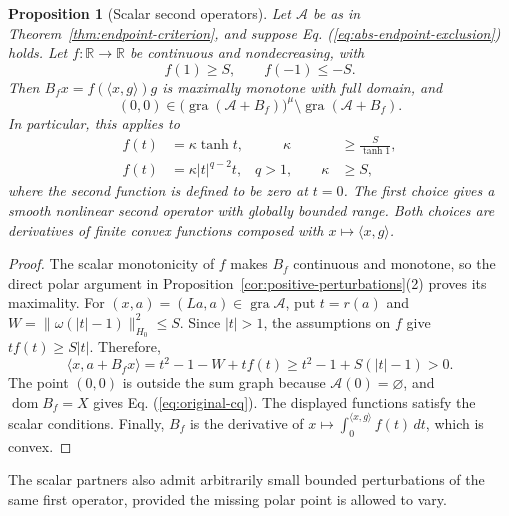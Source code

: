 \documentclass[11pt]{article}
\newcommand{\R}{\mathbb R}
\newcommand{\gra}{\operatorname{gra}}
\newcommand{\dom}{\operatorname{dom}}
\newcommand{\pair}[2]{\langle #1,#2\rangle}
\newtheorem{proposition}{Proposition}
\theoremstyle{definition}
\theoremstyle{remark}
\begin{document}
\begin{proposition}[Scalar second operators]
\label{cor:scalar-partners}
Let $\mathcal A$ be as in Theorem~\ref{thm:endpoint-criterion}, and suppose Eq. (\ref{eq:abs-endpoint-exclusion}) holds. Let $f:\R\to\R$ be continuous and nondecreasing, with
\[
f(1)\ge S,\qquad f(-1)\le-S.
\]
Then $B_f x=f(\pair{x}{g})g$ is maximally monotone with full domain, and
\[
(0,0)\in\bigl(\gra(\mathcal A+B_f)\bigr)^\mu\setminus\gra(\mathcal A+B_f).
\]
In particular, this applies to
\[
\begin{aligned}
f(t)&=\kappa\tanh t,&\qquad \kappa&\ge\frac{S}{\tanh1},\\
f(t)&=\kappa|t|^{q-2}t,& q>1,\qquad \kappa&\ge S,
\end{aligned}
\]
where the second function is defined to be zero at $t=0$. The first choice gives a smooth nonlinear second operator with globally bounded range. Both choices are derivatives of finite convex functions composed with $x\mapsto\pair{x}{g}$.
\end{proposition}
\begin{proof}
The scalar monotonicity of $f$ makes $B_f$ continuous and monotone, so the direct polar argument in Proposition~\ref{cor:positive-perturbations}(2) proves its maximality. For $(x,a)=(La,a)\in\gra\mathcal A$, put $t=r(a)$ and $W=\|\omega(|t|-1)\|_{H_0}^2\le S$. Since $|t|>1$, the assumptions on $f$ give $tf(t)\ge S|t|$. Therefore,
\[
\pair{x}{a+B_fx}=t^2-1-W+tf(t)
\ge t^2-1+S(|t|-1)>0.
\]
The point $(0,0)$ is outside the sum graph because $\mathcal A(0)=\varnothing$, and $\dom B_f=X$ gives Eq. (\ref{eq:original-cq}). The displayed functions satisfy the scalar conditions. Finally, $B_f$ is the derivative of $x\mapsto\int_0^{\pair{x}{g}}f(t)\,dt$, which is convex.
\end{proof}

The scalar partners also admit arbitrarily small bounded perturbations of the same first operator, provided the missing polar point is allowed to vary.
\end{document}
